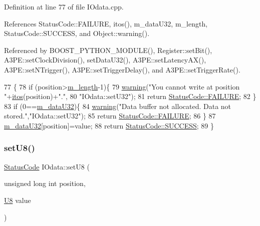 Definition at line 77 of file I\+Odata.\+cpp.



References Status\+Code\+::\+F\+A\+I\+L\+U\+RE, itos(), m\+\_\+data\+U32, m\+\_\+length, Status\+Code\+::\+S\+U\+C\+C\+E\+SS, and Object\+::warning().



Referenced by B\+O\+O\+S\+T\+\_\+\+P\+Y\+T\+H\+O\+N\+\_\+\+M\+O\+D\+U\+L\+E(), Register\+::set\+Bit(), A3\+P\+E\+::set\+Clock\+Division(), set\+Data\+U32(), A3\+P\+E\+::set\+Latency\+A\+X(), A3\+P\+E\+::set\+N\+Trigger(), A3\+P\+E\+::set\+Trigger\+Delay(), and A3\+P\+E\+::set\+Trigger\+Rate().


\begin{DoxyCode}
77                                                               \{
78   \textcolor{keywordflow}{if} (position>\hyperlink{classIOdata_afabe57441da019eb614d277799106aac}{m\_length}-1)\{
79     \hyperlink{classObject_a65cd4fda577711660821fd2cd5a3b4c9}{warning}(\textcolor{stringliteral}{"You cannot write at position "}+\hyperlink{Tools_8h_af330027dbdafb9a30768b3613c553e60}{itos}(position)+\textcolor{stringliteral}{"."},
80         \textcolor{stringliteral}{"IOdata::setU32"});
81     \textcolor{keywordflow}{return} \hyperlink{classStatusCode_a6f565cbeadc76d14c72f047e5e85eb4ba3da73d4c469762eb9d3c960368252b26}{StatusCode::FAILURE};
82   \}
83   \textcolor{keywordflow}{if} (0==\hyperlink{classIOdata_a247cdaefd87084e3cad1d530d592d99a}{m\_dataU32})\{
84     \hyperlink{classObject_a65cd4fda577711660821fd2cd5a3b4c9}{warning}(\textcolor{stringliteral}{"Data buffer not allocated. Data not stored."},\textcolor{stringliteral}{"IOdata::setU32"});
85     \textcolor{keywordflow}{return} \hyperlink{classStatusCode_a6f565cbeadc76d14c72f047e5e85eb4ba3da73d4c469762eb9d3c960368252b26}{StatusCode::FAILURE};
86   \}
87   \hyperlink{classIOdata_a247cdaefd87084e3cad1d530d592d99a}{m\_dataU32}[position]=value;
88   \textcolor{keywordflow}{return} \hyperlink{classStatusCode_a6f565cbeadc76d14c72f047e5e85eb4badd0da38d3ba0d922efd1f4619bc37ad8}{StatusCode::SUCCESS};
89 \}
\end{DoxyCode}
\mbox{\label{classIOdata_a6c4fb2f2af01889ada889c2b7aceb24d}} 
\subsubsection{\texorpdfstring{set\+U8()}{setU8()}}
{\footnotesize\ttfamily \hyperlink{classStatusCode}{Status\+Code} I\+Odata\+::set\+U8 (\begin{DoxyParamCaption}\item[{unsigned long int}]{position,  }\item[{\hyperlink{classIOdata_a18d1354b7cdaf0f8a8001fdbb3ced418}{U8}}]{value }\end{DoxyParamCaption})}



